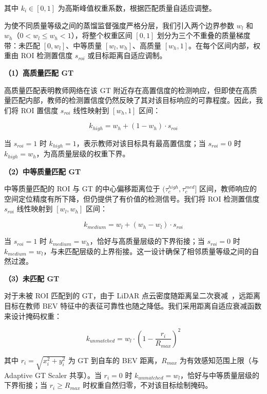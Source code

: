 \documentclass[12pt, UTF8]{ctexart}
\begin{document}
其中 $k_i \in [0, 1]$ 为高斯峰值权重系数，根据匹配质量自适应调整。

为使不同质量等级之间的蒸馏监督强度严格分层，我们引入两个边界参数 $w_l$ 和 $w_h$（$0 < w_l \leq w_h < 1$），将整个权重区间 $[0,1]$ 划分为三个不重叠的质量梯度带：未匹配 $[0, w_l]$、中等质量 $[w_l, w_h]$、高质量 $[w_h, 1]$。在每个区间内部，权重由 ROI 检测置信度 $s_{roi}$ 或目标距离自适应调制。

\textbf{（1）高质量匹配 GT}

高质量匹配表明教师网络在该 GT 附近存在高置信度的检测响应，但即使在高质量匹配内部，教师的检测置信度仍然反映了其对该目标响应的可靠程度。因此，我们将 ROI 置信度 $s_{roi}$ 线性映射到 $[w_h, 1]$ 区间：

\begin{equation}
k_{high} = w_h + (1 - w_h) \cdot s_{roi}
\end{equation}

当 $s_{roi} = 1$ 时 $k_{high} = 1$，表示教师对该目标具有最高置信度；当 $s_{roi} = 0$ 时 $k_{high} = w_h$，为高质量层级的权重下界。

\textbf{（2）中等质量匹配 GT}

中等质量匹配的 ROI 与 GT 的中心偏移距离位于 $(\tau^{high}_c, \tau^{med}_c]$ 区间，教师响应的空间定位精度有所下降，但仍提供了有价值的检测信号。我们将 ROI 检测置信度 $s_{roi}$ 线性映射到 $[w_l, w_h]$ 区间：

\begin{equation}
k_{medium} = w_l + (w_h - w_l) \cdot s_{roi}
\end{equation}

当 $s_{roi} = 1$ 时 $k_{medium} = w_h$，恰好与高质量层级的下界衔接；当 $s_{roi} = 0$ 时 $k_{medium} = w_l$，与未匹配层级的上界衔接。这一设计确保了相邻质量等级之间的自然过渡。

\textbf{（3）未匹配 GT}

对于未被 ROI 匹配到的 GT，由于 LiDAR 点云密度随距离呈二次衰减~\cite{raanet,density_aware_thresh}，远距离目标在教师 BEV 特征中的表征可靠性也随之降低。我们采用距离自适应衰减函数来设计掩码权重：

\begin{equation}
k_{unmatched} = w_l \cdot \left(1 - \frac{r_i}{R_{max}}\right)^{\!2}
\end{equation}

其中 $r_i = \sqrt{x_i^2 + y_i^2}$ 为 GT 到自车的 BEV 距离，$R_{max}$ 为有效感知范围上限（与 Adaptive GT Scaler 共享）。当 $r_i = 0$ 时 $k_{unmatched} = w_l$，恰好与中等质量层级的下界衔接；当 $r_i \geq R_{max}$ 时权重自然归零，不对该目标绘制掩码。
\end{document}
